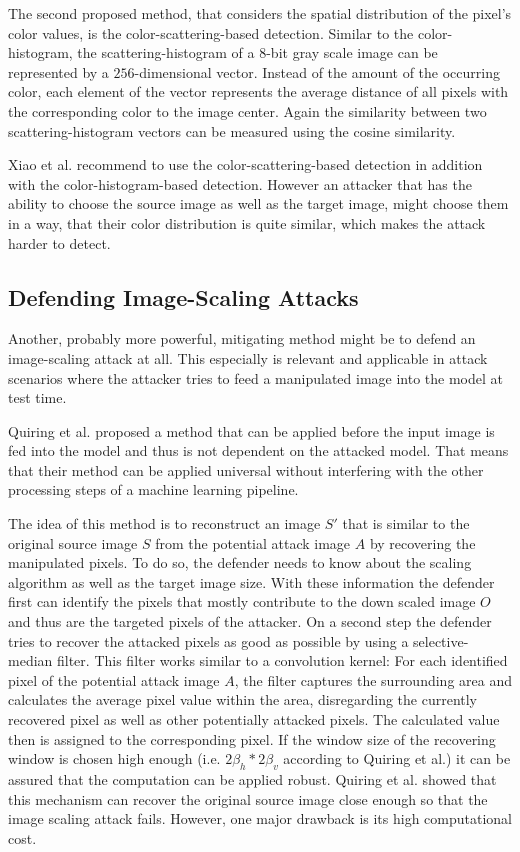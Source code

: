 \documentclass[sigconf]{acmart}
\begin{document}
The second proposed method, that considers the spatial distribution of the pixel's color values, is the color-scattering-based detection.
Similar to the color-histogram, the scattering-histogram of a $8$-bit gray scale image can be represented by a $256$-dimensional vector.
Instead of the amount of the occurring color, each element of the vector represents the average distance of all pixels with the corresponding color to the image center.
Again the similarity between two scattering-histogram vectors can be measured using the cosine similarity.

Xiao et al. recommend to use the color-scattering-based detection in addition with the color-histogram-based detection.
However an attacker that has the ability to choose the source image as well as the target image, might choose them in a way, that their color distribution is quite similar, which makes the attack harder to detect.

\subsection{Defending Image-Scaling Attacks}
Another, probably more powerful, mitigating method might be to defend an image-scaling attack at all.
This especially is relevant and applicable in attack scenarios where the attacker tries to feed a manipulated image into the model at test time.

Quiring et al.\cite{imgscale} proposed a method that can be applied before the input image is fed into the model and thus is not dependent on the attacked model.
That means that their method can be applied universal without interfering with the other processing steps of a machine learning pipeline.

The idea of this method is to reconstruct an image $S'$ that is similar to the original source image $S$ from the potential attack image $A$ by recovering the manipulated pixels.
To do so, the defender needs to know about the scaling algorithm as well as the target image size.
With these information the defender first can identify the pixels that mostly contribute to the down scaled image $O$ and thus are the targeted pixels of the attacker.
On a second step the defender tries to recover the attacked pixels as good as possible by using a selective-median filter.
This filter works similar to a convolution kernel: For each identified pixel of the potential attack image $A$, the filter captures the surrounding area and calculates the average pixel value within the area, disregarding the currently recovered pixel as well as other potentially attacked pixels.
The calculated value then is assigned to the corresponding pixel.
If the window size of the recovering window is chosen high enough (i.e. $2{\beta}_h * 2{\beta}_v$ according to Quiring et al.) it can be assured that the computation can be applied robust.
Quiring et al. showed that this mechanism can recover the original source image close enough so that the image scaling attack fails.
However, one major drawback is its high computational cost.
\end{document}
